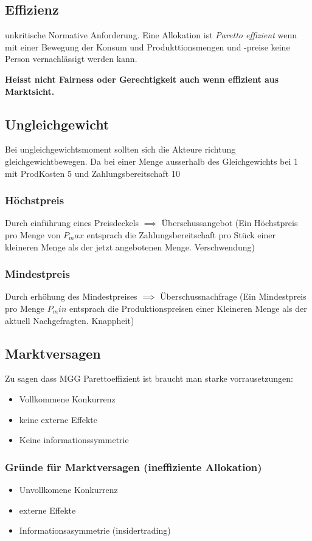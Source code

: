 \subsection{Effizienz}
\begin{definition}
     unkritische Normative Anforderung. Eine Allokation ist \textit{Paretto effizient} wenn mit einer Bewegung der Konsum und Produkttionsmengen und -preise keine Person vernachlässigt werden kann.
\end{definition}

\textbf{Heisst nicht Fairness oder Gerechtigkeit auch wenn effizient aus Marktsicht.}

\subsection{Ungleichgewicht}
Bei ungleichgewichtsmoment sollten sich die Akteure richtung gleichgewichtbewegen. Da bei einer Menge ausserhalb des Gleichgewichts bei 1 mit ProdKosten 5 und Zahlungsbereitschaft 10 

\subsubsection{Höchstpreis}
Durch einführung eines Preisdeckels $\implies$ Überschussangebot (Ein Höchstpreis pro Menge von $P_max$ entsprach die Zahlungsbereitschaft pro Stück einer kleineren Menge als der jetzt angebotenen Menge. Verschwendung)
\subsubsection{Mindestpreis} 
Durch erhöhung des Mindestpreises $\implies$ Überschussnachfrage (Ein Mindestpreis pro Menge $P_min$ entsprach die Produktionspreisen einer Kleineren Menge als der aktuell Nachgefragten. Knappheit)

\subsection{Marktversagen}
Zu sagen dass MGG Parettoeffizient ist braucht man starke vorrausetzungen:
\begin{itemize}
    \item Vollkommene Konkurrenz
    \item keine externe Effekte
    \item Keine informationssymmetrie
\end{itemize}

\subsubsection{Gründe für Marktversagen (ineffiziente Allokation)}
\begin{itemize}
    \item Unvollkomene Konkurrenz
    \item externe Effekte
    \item Informationsasymmetrie (insidertrading)
\end{itemize}

